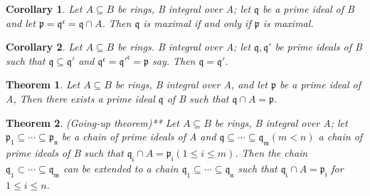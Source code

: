 \documentclass[]{report}
\newtheorem{theorem}{Theorem}[section]
\newtheorem{corollary}{Corollary}[theorem]
\begin{document}
\begin{corollary}
    Let $A\subseteq B$ be rings, B integral over A; let $\mathfrak{q}$ be a prime ideal of B and let $\mathfrak{p=q^c=q}\cap A$. Then $\mathfrak{q}$ is maximal if and only if $\mathfrak{p}$ is maximal. 
\end{corollary}

\begin{corollary}
    Let $A\subseteq B$ be rings. B integral over A; let $\mathfrak{q,q'}$ be prime ideals of B such that $\mathfrak{q\subseteq q'}$ and $\mathfrak{q^c = q'^{c} = p}$ say. Then $\mathfrak{q=q'}$.
\end{corollary}

\begin{theorem} 
    Let $A\subseteq B$ be rings, B integral over A, and let $\mathfrak{p}$ be a prime ideal of A, Then there exists a prime ideal $\mathfrak{q}$ of B such that $\mathfrak{q}\cap A = \mathfrak{p}$. 
\end{theorem}

\begin{theorem}
    (Going-up theorem)** Let $A\subseteq B$ be rings, B integral over A; let $\mathfrak{p_1 \subseteq \cdots \subseteq p_n}$ be a chain of prime ideals of A and $\mathfrak{q\subseteq \cdots \subseteq q_m} (m < n )$ a chain of prime ideals of B such that $\mathfrak{q_i}\cap A = \mathfrak{p_i} (1\leq i\leq m)$. Then the chain $\mathfrak{q_1\subset \cdots \subseteq q_m}$ can be extended to a chain $\mathfrak{q_1 \subseteq \cdots \subseteq q_n}$ such that $\mathfrak{q_i}\cap A = \mathfrak{p_i}$ for $1\leq i \leq n$.
\end{theorem}


\begin{thebibliography}{9}
\end{thebibliography}
\end{document}
